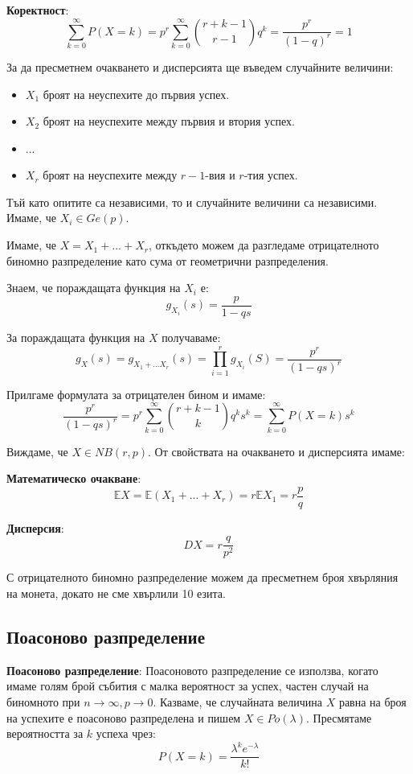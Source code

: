 \documentclass{article}
\renewcommand{\\}{\newline}
\begin{document}
\textbf{Коректност}: \[
  \sum_{k=0}^{\infty}P(X=k) = p^{r}\sum_{k=0}^{\infty}\binom{r+k-1}{r-1}q^{k} = \frac{p^{r}}{(1-q)^{r}} = 1
\] 

За да пресметнем очакването и дисперсията ще въведем случайните величини: \begin{itemize}
    \item \(X_1\) броят на неуспехите до първия успех.
    \item \(X_2\) броят на неуспехите между първия и втория успех.
    \item ...
    \item \(X_{r}\) броят на неуспехите между \(r-1\)-вия и \(r\)-тия успех.   
\end{itemize}


Тъй като опитите са независими, то и случайните величини са независими. Имаме, че \(X_{i} \in Ge(p)\).

Имаме, че \(X = X_1 + ...+X_r\), откъдето можем да разгледаме отрицателното биномно разпределение като сума от геометрични разпределения. 

Знаем, че пораждащата функция на \(X_i\) е: \[
  g_{X_i}(s) = \frac{p}{1- qs}
\] 

За пораждащата функция на \(X\) получаваме: \[
  g_{X}(s) = g_{X_1+...X_r}(s) = \prod_{i=1}^{r}g_{X_i}(S)=\frac{p^{r}}{(1-qs)^{r}}
\]  

Прилгаме формулата за отрицателен бином и имаме: \[
  \frac{p^{r}}{(1-qs)^{r}} = p^{r}\sum_{k=0}^{\infty}\binom{r+k-1}{k}q^{k}s^{k} = \sum_{k=0}^{\infty}P(X=k)s^{k}
\] 

Виждаме, че \(X \in NB(r,p)\). От свойствата на очакването и дисперсията имаме: 

\textbf{Математическо очакване}: \[
  \mathbb{E}X = \mathbb{E}(X_1 + ... + X_r) = r \mathbb{E}X_1 = r \frac{p}{q}
\] 

\textbf{Дисперсия}: \[
  DX = r \frac{q}{p^{2}}
\]   

С отрицателното биномно разпределение можем да пресметнем броя хвърляния на монета, докато не сме хвърлили 10 езита.

\subsection{Поасоново разпределение}

\textbf{Поасоново разпределение}: Поасоновото разпределение се използва, когато имаме голям брой събития с малка вероятност за успех, частен случай на биномното при \(n \to \infty, p \to 0\). Казваме, че случайната величина \(X\) равна на броя на успехите е поасоново разпределена и пишем \(X \in Po(\lambda)\). Пресмятаме вероятността за \(k\) успеха чрез:\[
  P(X=k) = \frac{\lambda^{k}e^{-\lambda}}{k!}
\] 
\end{document}
